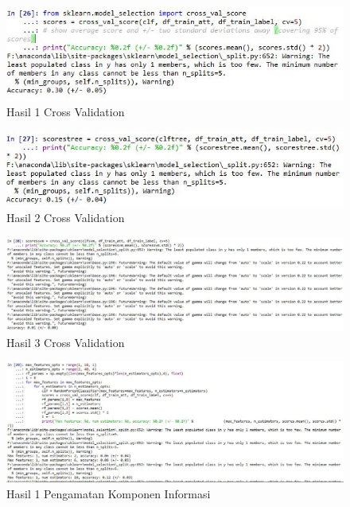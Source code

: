 \begin{figure}[ht]
	\centerline{\includegraphics[width=1\textwidth]{figures/huda/chapter3_praktek/29.JPG}}
	\caption{Hasil 1 Cross Validation}
	\label{h33}
\end{figure}

\begin{figure}[ht]
	\centerline{\includegraphics[width=1\textwidth]{figures/huda/chapter3_praktek/30.JPG}}
	\caption{Hasil 2 Cross Validation}
	\label{h34}
\end{figure}

\begin{figure}[ht]
	\centerline{\includegraphics[width=1\textwidth]{figures/huda/chapter3_praktek/31.JPG}}
	\caption{Hasil 3 Cross Validation}
	\label{h35}
\end{figure}

\begin{figure}[ht]
	\centerline{\includegraphics[width=1\textwidth]{figures/huda/chapter3_praktek/32.JPG}}
	\caption{Hasil 1 Pengamatan Komponen Informasi}
	\label{h36}
\end{figure}

